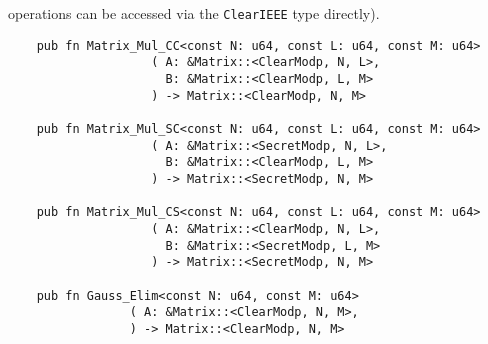 operations can be accessed via the \verb|ClearIEEE| type directly).
\begin{lstlisting}
    pub fn Matrix_Mul_CC<const N: u64, const L: u64, const M: u64>
                    ( A: &Matrix::<ClearModp, N, L>,
                      B: &Matrix::<ClearModp, L, M>
                    ) -> Matrix::<ClearModp, N, M> 

    pub fn Matrix_Mul_SC<const N: u64, const L: u64, const M: u64>
                    ( A: &Matrix::<SecretModp, N, L>,
                      B: &Matrix::<ClearModp, L, M>
                    ) -> Matrix::<SecretModp, N, M>

    pub fn Matrix_Mul_CS<const N: u64, const L: u64, const M: u64>
                    ( A: &Matrix::<ClearModp, N, L>,
                      B: &Matrix::<SecretModp, L, M>
                    ) -> Matrix::<SecretModp, N, M>

    pub fn Gauss_Elim<const N: u64, const M: u64>
                 ( A: &Matrix::<ClearModp, N, M>,
                 ) -> Matrix::<ClearModp, N, M>
\end{lstlisting}

